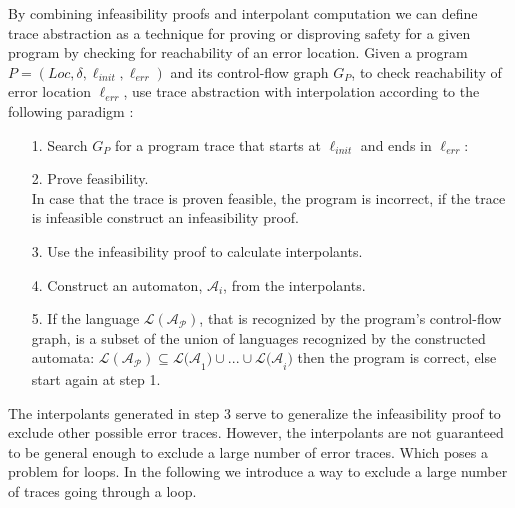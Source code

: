 \documentclass{article}
\begin{document}
By combining infeasibility proofs and interpolant computation we can define trace abstraction as a technique for proving or disproving safety for a given program by checking for reachability of an error location.
Given a program $P = (Loc, \delta, \ell_{init}, \ell_{err})$ and its control-flow graph $G_P$, to check reachability of error location $\ell_{err}$, use trace abstraction with interpolation according to the following paradigm \cite{10.1007/978-3-642-03237-0_7}: \\
\begin{itemize}
	\item[1.] Search $G_P$ for a program trace that starts at $\ell_{init}$ and ends in $\ell_{err}$:
	\begin{figure}[H]
		\centering
	\end{figure}
		\item[2.] Prove feasibility. \\ In case that the trace is proven feasible, the program is incorrect, if the trace is infeasible construct an infeasibility proof.
		\item[3.] Use the infeasibility proof to calculate interpolants.
		\item[4.] Construct an automaton, $\mathcal{A}_i$, from the interpolants.
		\item[5.] If the language $\mathcal{L(A_P)}$, that is recognized by the program's control-flow graph, is a subset of the union of languages recognized by the constructed automata: $\mathcal{L(A_P)} \subseteq \mathcal{L(A}_1) \cup ... \cup \mathcal{L(A}_i)$ then the program is correct, else start again at step 1.
	\end{itemize}
	The interpolants generated in step 3 serve to generalize the infeasibility proof to exclude other possible error traces. However, the interpolants are not guaranteed to be general enough to exclude a large number of error traces. Which poses a problem for loops. In the following we introduce a way to exclude a large number of traces going through a loop.
\end{document}
